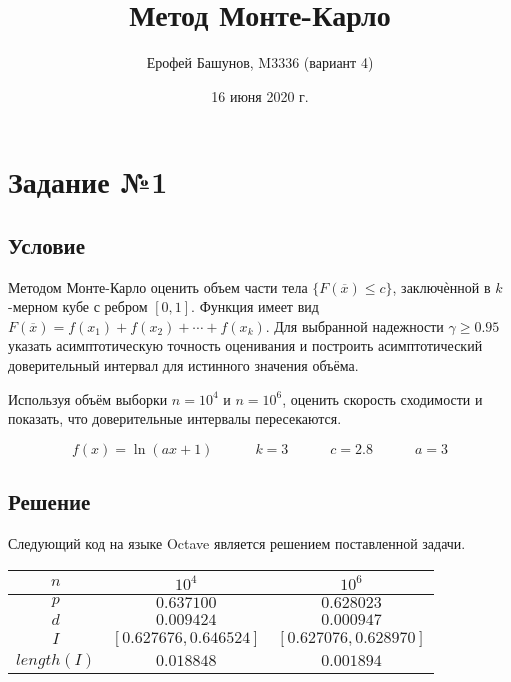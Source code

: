 \documentclass[a4paper,fontsize=13pt]{article}
\title{Метод Монте-Карло}
\date{16 июня 2020 г.}
\author{Ерофей Башунов, M3336 (вариант 4)}
\begin{document}

\maketitle %
\newpage %

\section*{Задание №1}

\subsection*{Условие}

\tab Методом Монте-Карло оценить объем части тела $\{F(\overline{x}) \le c \}$, заключѐнной в $k$-мерном кубе с ребром $[0, 1]$. Функция имеет вид $F(\overline{x}) = f(x_1) + f(x_2) + \cdots + f(x_k)$. Для выбранной надежности $\gamma \ge 0.95$ указать асимптотическую точность оценивания и построить асимптотический доверительный интервал для истинного значения объёма.

Используя объём выборки $n=10^4$ и $n=10^6$, оценить скорость сходимости и показать, что доверительные интервалы пересекаются.

$$f(x) = \ln(ax + 1) \quad\quad\quad k = 3 \quad\quad\quad c = 2.8 \quad\quad\quad a = 3$$

\subsection*{Решение}

\tab Следующий код на языке Octave является решением поставленной задачи.


\begin{center}
\begin{tabular}{| c | c | c |}
\hline
 $n$ & $10^4$ & $10^6$ \\ 
 \hline
 $p$ & $0.637100$ & $0.628023$ \\  
 \hline
 $d$ & $0.009424$ & $0.000947$ \\  
 \hline
 $I$ & $[0.627676, 0.646524]$ & $[0.627076, 0.628970]$ \\
 \hline
 $length(I)$ & $0.018848$ & $0.001894$ \\
 \hline
\end{tabular}
\end{center}
\end{document}
